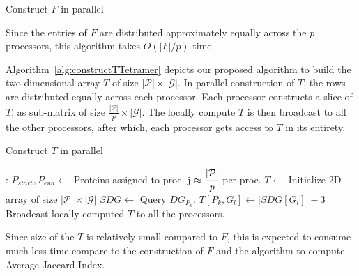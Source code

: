 \documentclass{article}[11pt]
\begin{document}
\begin{algorithm}[H]
\caption{Construct $F$ in parallel}
\label{alg:constructFTetramer}
\end{algorithm}
Since the entries of $F$ are distributed approximately equally across the $p$ processors, this algorithm takes $O(|F|/p)$ time.

Algorithm~\ref{alg:constructTTetramer} depicts our proposed algorithm to build the two dimensional array $T$ of size $|| \times ||$. 
In parallel construction of $T$, the rows are distributed equally across each processor.
Each processor constructs a slice of $T$, as sub-matrix of size $ \times ||$.
The locally compute $T$ is then broadcast to all the other processors, after which, each processor gets access to $T$ in its entirety. 
\begin{algorithm}[H]
\caption{Construct $T$ in parallel}
\label{alg:constructTTetramer}
    \begin{algorithmic}[1]
        :
          \State $P_{start}, P_{end} \gets$ Proteins assigned to proc. j
          \Comment  $\approx {}$ per proc.
          \State $T\gets$ Initialize 2D array of size $||\times ||$
             \State $SDG \gets$ Query $DG_{P_k}$.
                    \State $T[P_k, G_l] \gets|SDG[G_l]| - 3$
             \EndFor
          \EndFor
          \State Broadcast locally-computed $T$ to all the processors.
        \EndFunction
    \end{algorithmic}
\end{algorithm}
Since size of the $T$ is relatively small compared to $F$, this is expected to consume much less time compare to the construction of $F$ and the algorithm to compute Average Jaccard Index.
\end{document}
